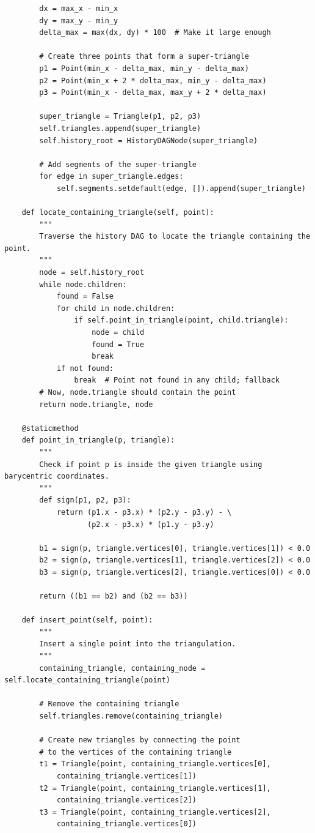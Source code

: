 \documentclass{article}
\begin{document}
\begin{verbatim}
        dx = max_x - min_x
        dy = max_y - min_y
        delta_max = max(dx, dy) * 100  # Make it large enough

        # Create three points that form a super-triangle
        p1 = Point(min_x - delta_max, min_y - delta_max)
        p2 = Point(min_x + 2 * delta_max, min_y - delta_max)
        p3 = Point(min_x - delta_max, max_y + 2 * delta_max)

        super_triangle = Triangle(p1, p2, p3)
        self.triangles.append(super_triangle)
        self.history_root = HistoryDAGNode(super_triangle)

        # Add segments of the super-triangle
        for edge in super_triangle.edges:
            self.segments.setdefault(edge, []).append(super_triangle)

    def locate_containing_triangle(self, point):
        """
        Traverse the history DAG to locate the triangle containing the point.
        """
        node = self.history_root
        while node.children:
            found = False
            for child in node.children:
                if self.point_in_triangle(point, child.triangle):
                    node = child
                    found = True
                    break
            if not found:
                break  # Point not found in any child; fallback
        # Now, node.triangle should contain the point
        return node.triangle, node

    @staticmethod
    def point_in_triangle(p, triangle):
        """
        Check if point p is inside the given triangle using barycentric coordinates.
        """
        def sign(p1, p2, p3):
            return (p1.x - p3.x) * (p2.y - p3.y) - \
                   (p2.x - p3.x) * (p1.y - p3.y)

        b1 = sign(p, triangle.vertices[0], triangle.vertices[1]) < 0.0
        b2 = sign(p, triangle.vertices[1], triangle.vertices[2]) < 0.0
        b3 = sign(p, triangle.vertices[2], triangle.vertices[0]) < 0.0

        return ((b1 == b2) and (b2 == b3))

    def insert_point(self, point):
        """
        Insert a single point into the triangulation.
        """
        containing_triangle, containing_node = self.locate_containing_triangle(point)

        # Remove the containing triangle
        self.triangles.remove(containing_triangle)

        # Create new triangles by connecting the point 
        # to the vertices of the containing triangle
        t1 = Triangle(point, containing_triangle.vertices[0], 
            containing_triangle.vertices[1])
        t2 = Triangle(point, containing_triangle.vertices[1], 
            containing_triangle.vertices[2])
        t3 = Triangle(point, containing_triangle.vertices[2], 
            containing_triangle.vertices[0])


\end{verbatim}
\end{document}

